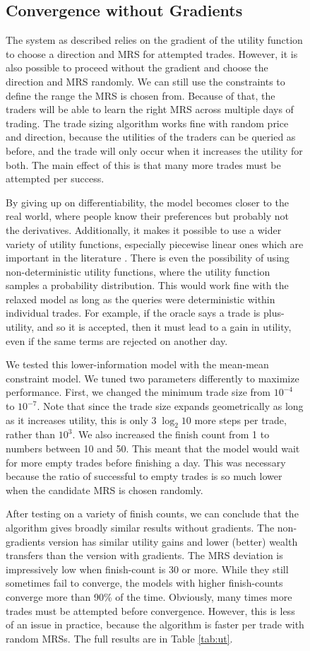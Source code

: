 \documentclass[12pt,a4paper,titlepage]{article}
\newcommand{\co}[1]{\textsf{#1}}
\begin{document}
\begin{figure}[H]
\subsection{Convergence without Gradients}\label{nograd}
The system as described relies on the gradient of the utility function to choose a direction and MRS for attempted trades.
However, it is also possible to proceed without the gradient and choose the direction and MRS randomly.
We can still use the constraints to define the range the MRS is chosen from.
Because of that, the traders will be able to learn the right MRS across multiple days of trading.
The trade sizing algorithm works fine with random price and direction, because the utilities of the traders can be queried as before, and the trade will only occur when it increases the utility for both.
The main effect of this is that many more trades must be attempted per success.

By giving up on differentiability, the model becomes closer to the real world, where people know their preferences but probably not the derivatives.
Additionally, it makes it possible to use a wider variety of utility functions, especially piecewise linear ones which are important in the literature \cite{chen}.
There is even the possibility of using non-deterministic utility functions, where the utility function samples a probability distribution.
This would work fine with the relaxed model as long as the queries were deterministic within individual trades.
For example, if the oracle says a trade is plus-utility, and so it is accepted, then it must lead to a gain in utility, even if the same terms are rejected on another day.

We tested this lower-information model with the \co{mean}-\co{mean} constraint model.
We tuned two parameters differently to maximize performance. 
First, we changed the minimum trade size from $10^{-4}$ to $10^{-7}$.
Note that since the trade size expands geometrically as long as it increases utility, this is only $3 \; \log_2 10$ more steps per trade, rather than $10^3$.
We also increased the finish count from 1 to numbers between 10 and 50.
This meant that the model would wait for more empty trades before finishing a day.
This was necessary because the ratio of successful to empty trades is so much lower when the candidate MRS is chosen randomly.

After testing on a variety of finish counts, we can conclude that the algorithm gives broadly similar results without gradients. 
The non-gradients version has similar utility gains and lower (better) wealth transfers than the version with gradients.
The MRS deviation is impressively low when finish-count is 30 or more.
While they still sometimes fail to converge, the models with higher finish-counts converge more than 90\% of the time.
Obviously, many times more trades must be attempted before convergence.
However, this is less of an issue in practice, because the algorithm is faster per trade with random MRSs.
The full results are in Table \ref{tab:ut}.


\end{figure}
\end{document}
